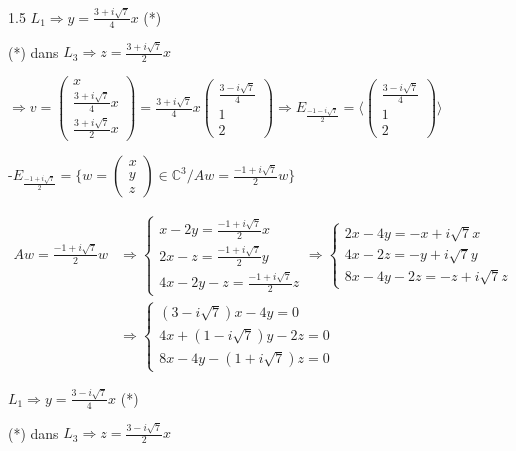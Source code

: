 \documentclass[12pt]{article}
\begin{document}
\begin{spacing}{1.5}
$L_1\Longrightarrow y=\frac{3+i\sqrt{7}}{4}x$ (*)

(*) dans $L_3\Longrightarrow z=\frac{3+i\sqrt{7}}{2}x$

$\Rightarrow v=\begin{pmatrix}
x\\
\frac{3+i\sqrt{7}}{4}x\\
\frac{3+i\sqrt{7}}{2}x
\end{pmatrix}= \frac{3+i\sqrt{7}}{4}x\begin{pmatrix}
 \frac{3-i\sqrt{7}}{4}\\
1\\
2
\end{pmatrix}\Rightarrow E_{\frac{-1-i\sqrt{7}}{2}}=\langle\begin{pmatrix}
\frac{3-i\sqrt{7}}{4}\\
1\\
2
\end{pmatrix}\rangle$

\medskip
-$E_{\frac{-1+i\sqrt{7}}{2}}=\{w=\begin{pmatrix}
x\\
y\\
z
\end{pmatrix}\in \mathbb{C}^3/Aw=\frac{-1+i\sqrt{7}}{2}w\}$

\begin{align*}
Aw=\frac{-1+i\sqrt{7}}{2}w &\Rightarrow \begin{cases}
x-2y=\frac{-1+i\sqrt{7}}{2}x\\
2x-z=\frac{-1+i\sqrt{7}}{2}y\\
4x-2y-z=\frac{-1+i\sqrt{7}}{2}z
\end{cases}\Rightarrow\begin{cases}
2x-4y=-x+i\sqrt{7}x\\
4x-2z=-y+i\sqrt{7}y\\
8x-4y-2z=-z+i\sqrt{7}z
\end{cases}\\
&\Rightarrow \begin{cases}
(3-i\sqrt{7})x-4y=0\\
4x+(1-i\sqrt{7})y-2z=0\\
8x-4y-(1+i\sqrt{7})z=0
\end{cases}
\end{align*}

$L_1\Longrightarrow y=\frac{3-i\sqrt{7}}{4}x$ (*)

(*) dans $L_3\Longrightarrow z=\frac{3-i\sqrt{7}}{2}x$


\end{spacing}
\end{document}

